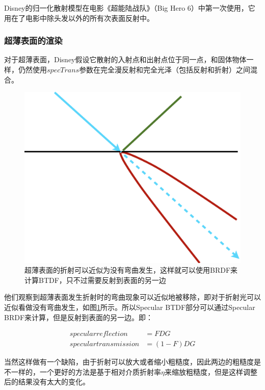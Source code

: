 Disney的归一化散射模型在电影《超能陆战队》（Big Hero 6）中第一次使用，它用在了电影中除头发以外的所有次表面反射中。





\subsubsection{超薄表面的渲染}
对于超薄表面，Disney假设它散射的入射点和出射点位于同一点，和固体物体一样，仍然使用$specTrans$参数在完全漫反射和完全光泽（包括反射和折射）之间混合。

\begin{figure}
\sidecaption
	\includegraphics[width=.35\textwidth]{figures/intro/thin-refraction}
	\caption{超薄表面的折射可以近似为没有弯曲发生，这样就可以使用BRDF来计算BTDF，只不过需要反射到表面的另一边}
	\label{f:intro-thin-1}
\end{figure}

他们观察到超薄表面发生折射时的弯曲现象可以近似地被移除，即对于折射光可以近似看做没有弯曲发生，如图\ref{f:intro-thin-1}所示。所以Specular BTDF部分可以通过Specular BRDF来计算，但是反射到表面的另一边。即：

\begin{equation}
	\begin{aligned}
		specular reflection &= FDG\\
specular transmission &= (1-F)DG
	\end{aligned}
\end{equation}

\noindent 当然这样做有一个缺陷，由于折射可以放大或者缩小粗糙度，因此两边的粗糙度是不一样的，一个更好的方法是基于相对介质折射率$\eta$来缩放粗糙度，但是这样调整后的结果没有太大的变化。


